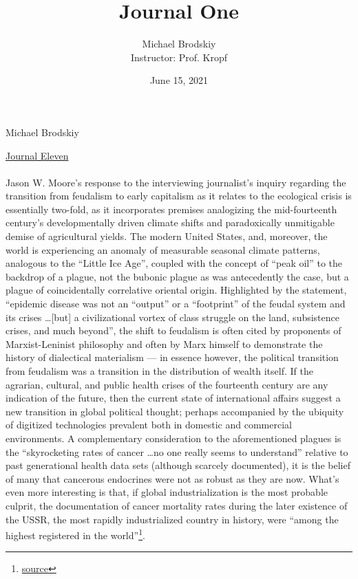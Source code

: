 \documentclass[12pt]{article}
\title{Journal One}
\date{June 15, 2021}
\author{Michael Brodskiy\\ \small Instructor: Prof. Kropf}
\begin{document}
\flushleft Michael Brodskiy

\begin{center}

 \underline{Journal Eleven}

\end{center}

\begin{justify}
  \paragraph{} Jason W. Moore's response to the interviewing journalist's inquiry regarding the transition from feudalism to early capitalism as it relates to the ecological crisis is essentially two-fold, as it incorporates premises analogizing the mid-fourteenth century's developmentally driven climate shifts and paradoxically unmitigable demise of agricultural yields. The modern United States, and, moreover, the world is experiencing an anomaly of measurable seasonal climate patterns, analogous to the “Little Ice Age”, coupled with the concept of “peak oil” to the backdrop of a plague, not the bubonic plague as was antecedently the case, but a plague of coincidentally correlative oriental origin. Highlighted by the statement, “epidemic disease was not an ``output'' or a ``footprint'' of the feudal system and its crises \dots [but] a civilizational vortex of class struggle on the land, subsistence crises, and much beyond”, the shift to feudalism is often cited by proponents of Marxist-Leninist philosophy and often by Marx himself to demonstrate the history of dialectical materialism — in essence however, the political transition from feudalism was a transition in the distribution of wealth itself. If the agrarian, cultural, and public health crises of the fourteenth century are any indication of the future, then the current state of international affairs suggest a new transition in global political thought; perhaps accompanied by the ubiquity of digitized technologies prevalent both in domestic and commercial environments. A complementary consideration to the aforementioned plagues is the “skyrocketing rates of cancer \dots no one really seems to understand” relative to past generational health data sets (although scarcely documented), it is the belief of many that cancerous endocrines were not as robust as they are now. What's even more interesting is that, if global industrialization is the most probable culprit, the documentation of cancer mortality rates during the later existence of the USSR, the most rapidly industrialized country in history, were “among the highest registered in the world”\footnote{\href{https://pubmed.ncbi.nlm.nih.gov/8262675/}{source}}. 
\end{justify}
\end{document}

